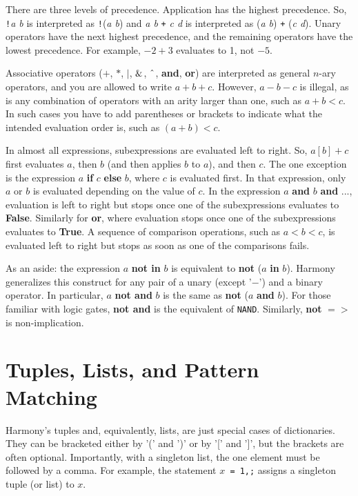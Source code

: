 \documentclass{report}
\begin{document}
There are three levels of precedence.
Application has the highest precedence.  So, \texttt{!}\textit{a b} is interpreted as
\texttt{!}(\textit{a b}) and \textit{a b} \texttt{+} \textit{c d} is interpreted as
(\textit{a b}) \texttt{+} (\textit{c d}).
Unary operators have the next highest precedence,
and the remaining operators have the lowest precedence.
For example, $-2 + 3$ evaluates to 1, not $-5$.

Associative operators ($+$, $*$, $|$, $\string&$, $\string^$, \textbf{and}, \textbf{or})
are interpreted as general $n$-ary operators, and you are allowed to write
$a + b + c$.  However, $a - b - c$ is illegal, as is any combination of operators with an
arity larger than one, such as $a + b < c$.
In such cases you have to add parentheses or brackets to indicate what
the intended evaluation order is, such as $(a + b) < c$.

In almost all expressions, subexpressions are evaluated left to right.
So, $a[b] + c$
first evaluates $a$, then $b$ (and then applies $b$ to $a$), and then $c$.  The one
exception is the expression $a$ \textbf{if} $c$ \textbf{else} $b$, where $c$ is evaluated
first.  In that expression, only $a$ or $b$ is evaluated depending on the value of $c$.
In the expression $a$ \textbf{and} $b$ \textbf{and} $...$, evaluation is left
to right but stops once one of the subexpressions evaluates to \textbf{False}.
Similarly for \textbf{or}, where evaluation stops once one of the subexpressions
evaluates to \textbf{True}.
A sequence of comparison operations, such as $a < b < c$, is evaluated left to right
but stops as soon as one of the comparisons fails.

As an aside:
the expression $a$ \textbf{not in} $b$ is equivalent to \textbf{not} ($a$ \textbf{in} $b$).
Harmony generalizes this construct for any pair of a unary (except '$-$') and a binary operator.
In particular, $a$ \textbf{not and} $b$ is the same as \textbf{not} ($a$ \textbf{and} $b$).  
For those familiar with logic gates, \textbf{not and} is the equivalent of \texttt{NAND}.
Similarly, \textbf{not} \texttt{$=>$} is non-implication.

\section{Tuples, Lists, and Pattern Matching}

Harmony's tuples and, equivalently, lists, are just special cases of dictionaries.
They can be bracketed either by '(' and ')' or by '[' and ']', but
the brackets are often optional.  Importantly, with a singleton list, the
one element must be followed by a comma.
For example, the statement \texttt{$x$ = 1,;} assigns a singleton tuple (or list) to $x$.
\end{document}
